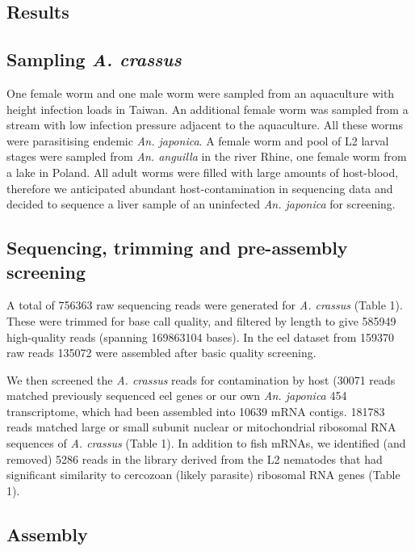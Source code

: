 \documentclass[10pt]{bmc_article}
\newenvironment{bmcformat}{\begin{raggedright}\baselineskip20pt\sloppy\setboolean{publ}{false}}{\end{raggedright}\baselineskip20pt\sloppy}
\begin{document}
\begin{bmcformat}
\section*{Results}


\subsection*{Sampling \textit{A. crassus}}

One female worm and one male worm were sampled from an aquaculture
with height infection loads in Taiwan. An additional female worm was
sampled from a stream with low infection pressure adjacent to the
aquaculture. All these worms were parasitising endemic
\textit{An. japonica}. A female worm and pool of L2 larval stages were
sampled from \textit{An. anguilla} in the river Rhine, one female worm
from a lake in Poland. All adult worms were filled with large amounts
of host-blood, therefore we anticipated abundant host-contamination in
sequencing data and decided to sequence a liver sample of an uninfected
\textit{An. japonica} for screening.

 \subsection*{Sequencing, trimming and pre-assembly screening}






A total of 756363 raw sequencing reads were
generated for \textit{A. crassus} (Table 1). These were trimmed for
base call quality, and filtered by length to give
585949 high-quality reads (spanning
169863104 bases). In the eel dataset from
159370 raw reads 135072 were
assembled after basic quality screening.

We then screened the \textit{A. crassus} reads for contamination by
host (30071 reads matched previously
sequenced eel genes or our own \textit{An. japonica} 454
transcriptome, which had been assembled into
10639 mRNA
contigs. 181783 reads matched large or
small subunit nuclear or mitochondrial ribosomal RNA sequences of
\textit{A. crassus} (Table 1). In addition to fish mRNAs, we
identified (and removed) 5286
reads in the library derived from the L2 nematodes that had
significant similarity to cercozoan (likely parasite) ribosomal RNA
genes (Table 1).

\subsection*{Assembly}



\end{bmcformat}
\end{document}
